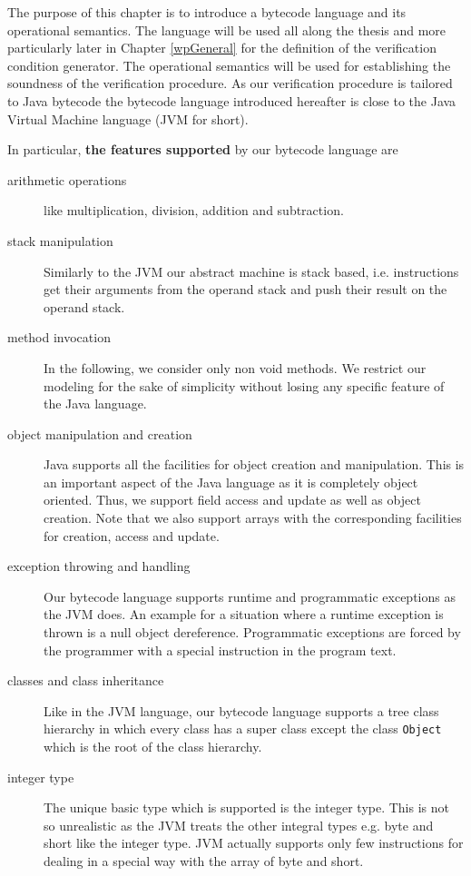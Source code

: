 
 The purpose of this chapter is to introduce a bytecode language 
 and its operational semantics. The language will be used all along the thesis and more particularly
  later in Chapter \ref{wpGeneral} for the definition of the verification condition generator.
 The operational semantics will be used 
 for establishing  the soundness of the verification procedure.
 As our verification procedure is tailored to Java bytecode 
 the bytecode language introduced hereafter is close to the 
 Java Virtual Machine  language \cite{VMSpec}(JVM for short). 
 
In particular, \textbf{the features supported} by our bytecode language are 
\begin{description} 
   \item  [arithmetic operations] like multiplication, division, addition and subtraction. 

   \item  [stack manipulation] Similarly to the JVM  our abstract machine is stack based, i.e. instructions
          get their arguments from the operand stack and push their result on the  operand stack.

   \item  [method invocation] In the following, we consider only  non void methods. 
          We restrict our modeling for the sake of simplicity without losing any specific feature of the Java language.
          
   \item  [object manipulation and creation] 
          Java supports all the facilities for object creation and manipulation.
	  This is an important aspect of the Java language as it is completely object oriented.
	  Thus, we support field access and update as well as object creation. Note that we also 
	  support arrays with the corresponding facilities for creation, access and update. 

   \item  [exception throwing and handling] Our bytecode language supports runtime and programmatic exceptions as the JVM does.
	  An example for a situation where a runtime exception is thrown is a null object dereference.  Programmatic exceptions
	  are forced by the programmer with a special instruction in the program text.
   
   \item  [classes and class inheritance] Like in the JVM language, our bytecode language supports  a tree class hierarchy in which every class 
          has a super class except the class \texttt{Object} which is the root of the class hierarchy.

   \item  [integer type] The unique basic type which is supported is the integer type.
          This is not so unrealistic as the JVM
	  treats the other integral types e.g. byte and short like the integer type. 
	  JVM actually supports only few instructions 
          for dealing in a special way with the array of byte and short.
	  
\end{description} 
 

